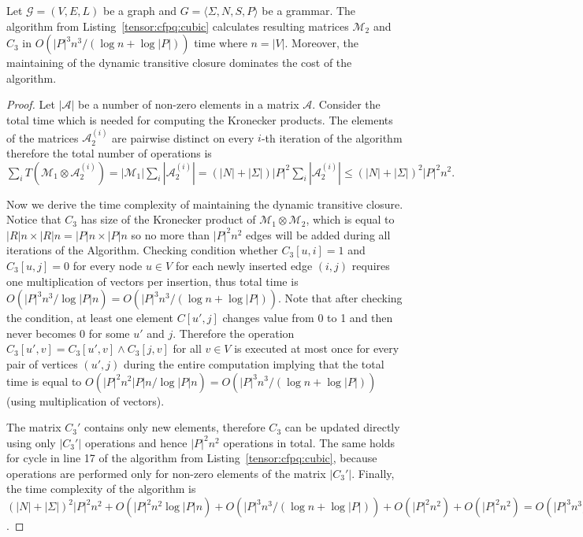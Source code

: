 \begin{theorem}{}
\label{theorem: subcubic}
    Let $\mathcal{G} = (V,E,L)$ be a graph and $G = \langle\Sigma, N, S, P\rangle$ be a grammar.
    The algorithm from Listing~\ref{tensor:cfpq:cubic} calculates resulting matrices $\mathcal{M}_2$ and $C_3$ in $O({|P|}^3n^3/(\log n + \log |P|))$ time where $n = |V|$. Moreover, the maintaining of the dynamic transitive closure dominates the cost of the algorithm.
\end{theorem}

\begin{proof}
 Let $|\mathcal{A}|$ be a number of non-zero elements in a matrix $\mathcal{A}$. Consider the total time which is needed for computing the Kronecker products. The elements of the matrices $\mathcal{A}_2^{(i)}$ are pairwise distinct on every $i$-th iteration of the algorithm therefore the total number of operations is $\sum\limits_i{T(\mathcal{M}_1 \otimes \mathcal{A}_2^{(i)})} = |\mathcal{M}_1| \sum\limits_i {|\mathcal{A}_2^{(i)}|} = (|N| + |\Sigma|){|P|}^2 \sum\limits_i {|\mathcal{A}_2^{(i)}|} \le {(|N| + |\Sigma|)}^2{|P|}^2 n^2.$


Now we derive the time complexity of maintaining the dynamic transitive closure.
Notice that $C_3$ has size of the Kronecker product of $\mathcal{M}_1 \otimes \mathcal{M}_2$, which is equal to $|R|n \times |R|n = |P|n \times |P|n$ so no more than ${|P|}^2n^2$ edges will be added during all iterations of the Algorithm. 
Checking condition whether $C_3[u, i] = 1$ and $C_3[u, j]=0$ for every node $u \in V$ for each newly inserted edge $(i, j)$ requires one multiplication of vectors per insertion, thus total time is $O({|P|}^3n^3/\log |P|n)=O({|P|}^3n^3/(\log n + \log |P|))$.
Note that after checking the condition, at least one element $C[u', j]$ changes value from 0 to 1 and then never becomes 0 for some $u'$ and $j$.
Therefore the operation $C_3[u',v] = C_3[u', v] \wedge C_3[j, v]$ for all $v \in V$ is executed at most once for every pair of vertices $(u',j)$ during the entire computation implying that the total time is equal to $O({|P|}^2n^2|P|n/\log |P|n)=O({|P|}^3n^3/(\log n + \log |P|))$ (using multiplication of vectors).


The matrix $C_3'$ contains only new elements, therefore $C_3$ can be updated directly using only $|C_3'|$ operations and hence ${|P|}^2n^2$ operations in total.
The same holds for cycle in line 17 of the algorithm from Listing~\ref{tensor:cfpq:cubic}, because operations are performed only for non-zero elements of the matrix $|C_3'|$.
Finally, the time complexity of the algorithm is ${(|N| + |\Sigma|)}^2{|P|}^2 n^2 + O({|P|}^2n^2 \log |P|n) + O({|P|}^3n^3/(\log n + \log |P|)) + O({|P|}^2n^2) + O({|P|}^2n^2)= O({|P|}^3n^3/(\log n + \log |P|))$.
\end{proof}{}

